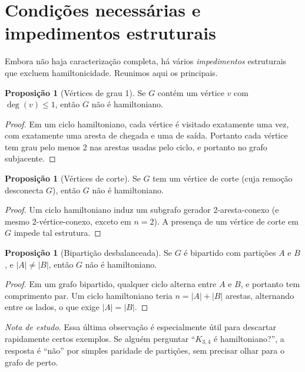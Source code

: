 \documentclass[11pt,a4paper]{article}
\theoremstyle{definition}
\newtheorem{prop}[teo]{Proposição}
\newcommand{\nota}[1]{%
  \par\medskip
  {\small\color{notagray}\textit{Nota de estudo.} #1}\par\medskip
}
\begin{document}
\section{Condições necessárias e impedimentos estruturais}

Embora não haja caracterização completa, há vários \emph{impedimentos} estruturais que excluem hamiltonicidade. Reunimos aqui os principais.

\begin{prop}[Vértices de grau 1]
Se $G$ contém um vértice $v$ com $\deg(v) \leq 1$, então $G$ não é hamiltoniano.
\end{prop}

\begin{proof}
Em um ciclo hamiltoniano, cada vértice é visitado exatamente uma vez, com exatamente uma aresta de chegada e uma de saída. Portanto cada vértice tem grau pelo menos 2 nas arestas usadas pelo ciclo, e portanto no grafo subjacente.
\end{proof}

\begin{prop}[Vértices de corte]
Se $G$ tem um vértice de corte (cuja remoção desconecta $G$), então $G$ não é hamiltoniano.
\end{prop}

\begin{proof}
Um ciclo hamiltoniano induz um subgrafo gerador 2-aresta-conexo (e mesmo 2-vértice-conexo, exceto em $n = 2$). A presença de um vértice de corte em $G$ impede tal estrutura.
\end{proof}

\begin{prop}[Bipartição desbalanceada]
Se $G$ é bipartido com partições $A$ e $B$, e $|A| \neq |B|$, então $G$ não é hamiltoniano.
\end{prop}

\begin{proof}
Em um grafo bipartido, qualquer ciclo alterna entre $A$ e $B$, e portanto tem comprimento par. Um ciclo hamiltoniano teria $n = |A| + |B|$ arestas, alternando entre os lados, o que exige $|A| = |B|$.
\end{proof}

\nota{Essa última observação é especialmente útil para descartar rapidamente certos exemplos. Se alguém perguntar ``$K_{3,4}$ é hamiltoniano?'', a resposta é ``não'' por simples paridade de partições, sem precisar olhar para o grafo de perto.}
\end{document}
